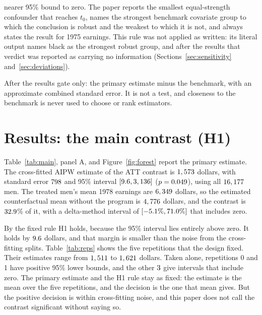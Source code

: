 \documentclass[11pt]{article}
\newcommand{\ci}[2]{$[#1, #2]$}
\begin{document}
\begin{description}
        nearer 95\% bound to zero. The paper reports the smallest equal-strength confounder
        that reaches $t_0$, names the strongest benchmark covariate group to which the conclusion is robust
        and the weakest to which it is not, and always states the result for 1975 earnings.
        This rule was not applied as written: its literal output names black as the strongest
        robust group, and after the results that verdict was reported as carrying no
        information (Sections~\ref{sec:sensitivity} and~\ref{sec:deviations}).
  \item[H2 (descriptive).] After the results gate only: the primary estimate minus
        the benchmark, with an approximate combined standard error. It is not a test, and
        closeness to the benchmark is never used to choose or rank estimators.
\end{description}

\section{Results: the main contrast (H1)}
\label{sec:results}

Table~\ref{tab:main}, panel A, and Figure~\ref{fig:forest} report the primary estimate. The
cross-fitted AIPW estimate of the ATT contrast is $1,573$ dollars, with standard
error $798$ and 95\% interval \ci{\PrimaryCiLow}{\PrimaryCiHigh} ($p = 0.049$),
using all $16,177$ men. The treated men's mean 1978 earnings are $6,349$
dollars, so the estimated counterfactual mean without the program is $4,776$
dollars, and the contrast is $32.9$\% of it, with a delta-method interval of
\ci{\PrimaryRelCiLow\%}{\PrimaryRelCiHigh\%} that includes zero.

By the fixed rule H1 holds, because the 95\% interval lies entirely above zero. It holds by
$9.6$ dollars, and that margin is smaller than the noise from the cross-fitting
splits. Table~\ref{tab:reps} shows the five repetitions that the design fixed. Their
estimates range from $1,511$ to $1,621$ dollars. Taken alone,
repetitions 0 and 1 have positive 95\% lower bounds, and the other
$3$ give intervals that include zero. The primary estimate and the
H1 rule stay as fixed: the estimate is the mean over the five repetitions, and the decision
is the one that mean gives. But the positive decision is within cross-fitting noise, and
this paper does not call the contrast significant without saying so.
\end{document}
